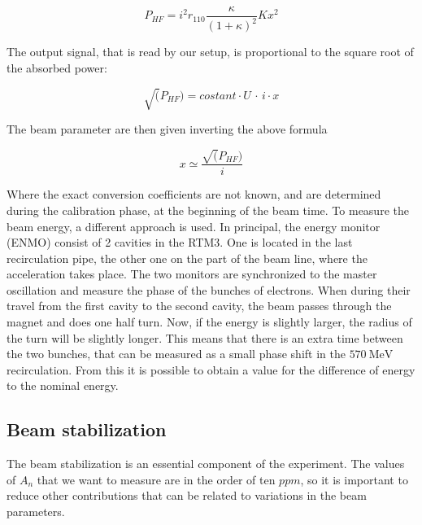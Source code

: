 \begin{equation}
P_{HF} = i^{2} r_{110} \frac{\kappa}{(1 + \kappa)^{2}} K x^{2}
\end{equation} 
 
The output signal, that is read by our setup, is proportional to the square root of the absorbed power:

\begin{equation}
\sqrt(P_{HF}) = costant \cdot U \, \cdot \, i   \cdot x
\end{equation} 

The beam parameter are then given inverting the above formula 

\begin{equation} \label{eq:SignalToVfc}
x \simeq \frac{\sqrt(P_{HF})}{i}
\end{equation}

Where the exact conversion coefficients are not known, and are determined during the calibration phase, at the beginning of the beam time.
To measure the beam energy, a different approach is used. In principal, the energy monitor (ENMO) consist of 2 cavities in the RTM3. One is located in the last recirculation pipe, the other one on the part of the beam line, where the acceleration takes place.
The two monitors are synchronized to the master oscillation and measure the phase of the bunches of electrons. When during their travel from the first cavity to the second cavity, the beam passes through the magnet and does one half turn. Now, if the energy is slightly larger, the radius of the turn will be slightly longer. This means that there is an extra time between the two bunches, that can be measured as a small phase shift in the $\SI{570}{\mega \electronvolt}$ recirculation. From this it is possible to obtain a value for the difference of energy to the nominal energy.

\subsection{Beam stabilization}

The beam stabilization is an essential component of the experiment. The values of $A_{n}$ that we want to measure are in the order of ten $ppm$, so it is important to reduce other contributions that can be related to variations in the beam parameters. 

